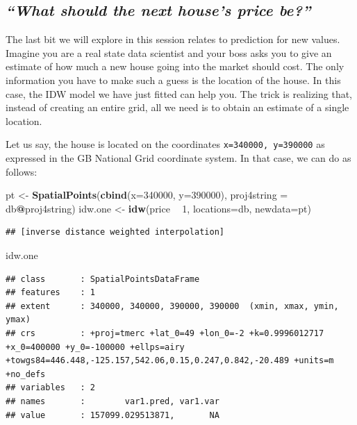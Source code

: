 \documentclass[]{book}
\newenvironment{Shaded}{\begin{snugshade}}{\end{snugshade}}
\newcommand{\KeywordTok}[1]{\textcolor[rgb]{0.13,0.29,0.53}{\textbf{#1}}}
\newcommand{\DataTypeTok}[1]{\textcolor[rgb]{0.13,0.29,0.53}{#1}}
\newcommand{\DecValTok}[1]{\textcolor[rgb]{0.00,0.00,0.81}{#1}}
\newcommand{\StringTok}[1]{\textcolor[rgb]{0.31,0.60,0.02}{#1}}
\newcommand{\OperatorTok}[1]{\textcolor[rgb]{0.81,0.36,0.00}{\textbf{#1}}}
\newcommand{\NormalTok}[1]{#1}
\begin{document}
\subsection{\texorpdfstring{\emph{``What should the next house's price
be?''}}{What should the next house's price be?}}\label{what-should-the-next-houses-price-be}

The last bit we will explore in this session relates to prediction for
new values. Imagine you are a real state data scientist and your boss
asks you to give an estimate of how much a new house going into the
market should cost. The only information you have to make such a guess
is the location of the house. In this case, the IDW model we have just
fitted can help you. The trick is realizing that, instead of creating an
entire grid, all we need is to obtain an estimate of a single location.

Let us say, the house is located on the coordinates
\texttt{x=340000,\ y=390000} as expressed in the GB National Grid
coordinate system. In that case, we can do as follows:

\begin{Shaded}
\begin{Highlighting}[]
\NormalTok{pt <-}\StringTok{ }\KeywordTok{SpatialPoints}\NormalTok{(}\KeywordTok{cbind}\NormalTok{(}\DataTypeTok{x=}\DecValTok{340000}\NormalTok{, }\DataTypeTok{y=}\DecValTok{390000}\NormalTok{),}
                    \DataTypeTok{proj4string =}\NormalTok{ db}\OperatorTok{@}\NormalTok{proj4string)}
\NormalTok{idw.one <-}\StringTok{ }\KeywordTok{idw}\NormalTok{(price }\OperatorTok{~}\StringTok{ }\DecValTok{1}\NormalTok{, }\DataTypeTok{locations=}\NormalTok{db, }\DataTypeTok{newdata=}\NormalTok{pt)}
\end{Highlighting}
\end{Shaded}

\begin{verbatim}
## [inverse distance weighted interpolation]
\end{verbatim}

\begin{Shaded}
\begin{Highlighting}[]
\NormalTok{idw.one}
\end{Highlighting}
\end{Shaded}

\begin{verbatim}
## class       : SpatialPointsDataFrame 
## features    : 1 
## extent      : 340000, 340000, 390000, 390000  (xmin, xmax, ymin, ymax)
## crs         : +proj=tmerc +lat_0=49 +lon_0=-2 +k=0.9996012717 +x_0=400000 +y_0=-100000 +ellps=airy +towgs84=446.448,-125.157,542.06,0.15,0.247,0.842,-20.489 +units=m +no_defs 
## variables   : 2
## names       :        var1.pred, var1.var 
## value       : 157099.029513871,       NA
\end{verbatim}
\end{document}
